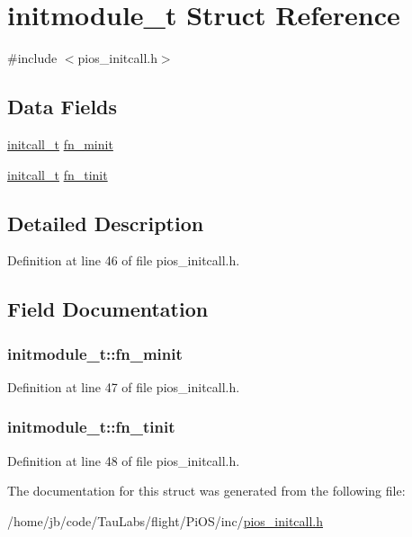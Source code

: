 \hypertarget{structinitmodule__t}{\section{initmodule\-\_\-t \-Struct \-Reference}
\label{structinitmodule__t}
}


{\ttfamily \#include $<$pios\-\_\-initcall.\-h$>$}

\subsection*{\-Data \-Fields}
\begin{DoxyCompactItemize}
\item 
\hyperlink{group___p_i_o_s___i_n_i_t_c_a_l_l_ga4f58a033b271ad632c4583977de7e3c0}{initcall\-\_\-t} \hyperlink{structinitmodule__t_ada4d22cb004c06a158b05703774113a0}{fn\-\_\-minit}
\item 
\hyperlink{group___p_i_o_s___i_n_i_t_c_a_l_l_ga4f58a033b271ad632c4583977de7e3c0}{initcall\-\_\-t} \hyperlink{structinitmodule__t_a75491302bbfa9a34608832bb9bbf83ff}{fn\-\_\-tinit}
\end{DoxyCompactItemize}


\subsection{\-Detailed \-Description}


\-Definition at line 46 of file pios\-\_\-initcall.\-h.



\subsection{\-Field \-Documentation}
\hypertarget{structinitmodule__t_ada4d22cb004c06a158b05703774113a0}{
\subsubsection[{fn\-\_\-minit}]{ {\bf initmodule\-\_\-t\-::fn\-\_\-minit}}}\label{structinitmodule__t_ada4d22cb004c06a158b05703774113a0}


\-Definition at line 47 of file pios\-\_\-initcall.\-h.

\hypertarget{structinitmodule__t_a75491302bbfa9a34608832bb9bbf83ff}{
\subsubsection[{fn\-\_\-tinit}]{ {\bf initmodule\-\_\-t\-::fn\-\_\-tinit}}}\label{structinitmodule__t_a75491302bbfa9a34608832bb9bbf83ff}


\-Definition at line 48 of file pios\-\_\-initcall.\-h.



\-The documentation for this struct was generated from the following file\-:\begin{DoxyCompactItemize}
\item 
/home/jb/code/\-Tau\-Labs/flight/\-Pi\-O\-S/inc/\hyperlink{pios__initcall_8h}{pios\-\_\-initcall.\-h}\end{DoxyCompactItemize}
